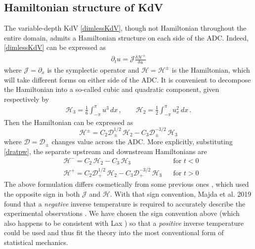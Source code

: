 \documentclass[11pt]{article}
\newcommand{\pdi}[2] { {\partial_#2} #1 }
\newcommand{\dx}{\, dx}
\newcommand{\drat}{\mathcal{D}}
\newcommand{\dratdn}{\drat_+}
\newcommand{\dratupdn}{\drat_{\pm}}
\newcommand{\sympJ}{\mathcal{J}}
\newcommand{\vard}[2]{\frac{\delta #1}{\delta #2}}
\newcommand{\Ham}{\mathcal{H}}
\newcommand{\Hup}{\Ham^{-}}
\newcommand{\Hdn}{\Ham^{+}}
\newcommand{\Hupdn}{\Ham^{\pm}}
\newcommand{\Hthree}{\Ham_{3}}
\newcommand{\Htwo}{\Ham_{2}}
\begin{document}
 

\subsection{Hamiltonian structure of KdV}
\label{HamiltonianSection}

The variable-depth KdV \eqref{dimlessKdV}, though not Hamiltonian throughout the entire domain, admits a Hamiltonian structure on each side of the ADC. Indeed, \eqref{dimlessKdV} can be expressed as
\begin{align}
\partial_t{u} = \sympJ \vard{\Hupdn}{u}
\end{align}
where $\sympJ = \pdi{}{x}$ is the symplectic operator and $\Ham = \Hupdn$ is the Hamiltonian, which will take different forms on either side of the ADC. It is convenient to decompose the Hamiltonian into a so-called cubic and quadratic component, given respectively by
\begin{align}
\label{H3H2}
\Hthree = \frac{1}{6} \int_{-\pi}^{\pi} u^3 \dx	\, , \qquad
\Htwo = \frac{1}{2} \int_{-\pi}^{\pi} u_x^2 \dx	\, .
\end{align}
Then the Hamiltonian can be expressed as
\begin{equation}
\label{Hamiltonian}
\Hupdn = C_2 \dratupdn^{1/2} \, \Htwo - C_3 \dratupdn^{-3/2} \, \Hthree
\end{equation}
where $\drat = \dratupdn$ changes value across the ADC. More explicitly, substituting \eqref{dratpw}, the separate upstream and downstream Hamiltonians are
\begin{align}
&\Hup = C_2 \, \Htwo - C_3 \, \Hthree 						&& \text{for } t<0 \\
&\Hdn = C_2 \dratdn^{1/2} \, \Htwo - C_3 \dratdn^{-3/2} \, \Hthree	&& \text{for } t>0
\end{align}
The above formulation differs cosmetically from some previous ones \cite{abramov2003hamiltonian, bajars2013weakly, majda2019statistical}, which used the opposite sign in both $\sympJ$ and $\Ham$. With that sign convention, Majda et al. 2019 found that a {\em negative} inverse temperature is required to accurately describe the experimental observations \cite{majda2019statistical}. We have chosen the sign convention above (which also happens to be consistent with Lax \cite{lax1975periodic}) so that a {\em positive} inverse temperature could be used and thus fit the theory into the most conventional form of statistical mechanics.
\end{document}
